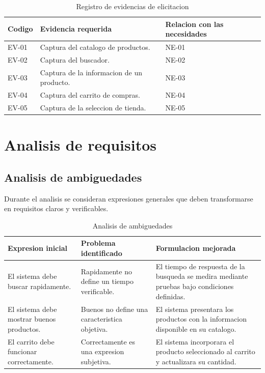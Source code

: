 \documentclass[11pt,a4paper]{article}
\begin{document}
\begin{table}[H]
\centering
\caption{Registro de evidencias de elicitacion}
\small
\begin{tabularx}{\textwidth}{p{2cm}p{4cm}Y}
\toprule
\textbf{Codigo} &
\textbf{Evidencia requerida} &
\textbf{Relacion con las necesidades} \\
\midrule

EV-01 &
Captura del catalogo de productos. &
NE-01 \\

EV-02 &
Captura del buscador. &
NE-02 \\

EV-03 &
Captura de la informacion de un producto. &
NE-03 \\

EV-04 &
Captura del carrito de compras. &
NE-04 \\

EV-05 &
Captura de la seleccion de tienda. &
NE-05 \\

\bottomrule
\end{tabularx}
\end{table}

\section{Analisis de requisitos}

\subsection{Analisis de ambiguedades}

Durante el analisis se consideran expresiones
generales que deben transformarse en requisitos
claros y verificables.

\begin{table}[H]
\centering
\caption{Analisis de ambiguedades}
\small
\begin{tabularx}{\textwidth}{p{4cm}YY}
\toprule
\textbf{Expresion inicial} &
\textbf{Problema identificado} &
\textbf{Formulacion mejorada} \\
\midrule

El sistema debe buscar rapidamente. &
Rapidamente no define un tiempo verificable. &
El tiempo de respuesta de la busqueda se medira
mediante pruebas bajo condiciones definidas. \\

El sistema debe mostrar buenos productos. &
Buenos no define una caracteristica objetiva. &
El sistema presentara los productos con la
informacion disponible en su catalogo. \\

El carrito debe funcionar correctamente. &
Correctamente es una expresion subjetiva. &
El sistema incorporara el producto seleccionado
al carrito y actualizara su cantidad. \\

\bottomrule
\end{tabularx}
\end{table}
\end{document}
